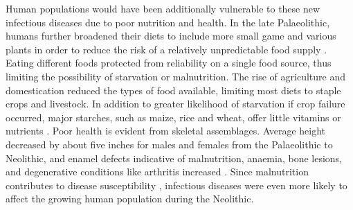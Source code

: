 Human populations would have been additionally vulnerable to these new infectious diseases due to poor nutrition and health. 
In the late Palaeolithic, humans further broadened their diets to include more small
 game and various plants in order to reduce the risk of a relatively unpredictable 
food supply \parencites[6993--6994]{Stiner_2001}[25--26]{Stiner_2002}. 
Eating different foods protected from reliability on a single food source,
thus limiting the possibility of starvation or malnutrition. 
The rise of agriculture and domestication reduced the types of food available, 
limiting most diets to staple crops and livestock.
In addition to greater 
likelihood of starvation if crop failure occurred, major starches, 
such as maize, rice and wheat, offer little vitamins or nutrients \parencite{Larsen_1995}. 
Poor health is evident from skeletal assemblages. 
Average height decreased by about five inches for males and females from the 
Palaeolithic to Neolithic, and enamel defects indicative of malnutrition, anaemia,
 bone lesions, and degenerative conditions like arthritis increased \parencite{Armelagos_1984}. 
Since malnutrition contributes to disease susceptibility \parencites[119]{Diamond_1987}{Cohen_2000}, 
infectious diseases were even more likely to affect the growing human population during the Neolithic.

